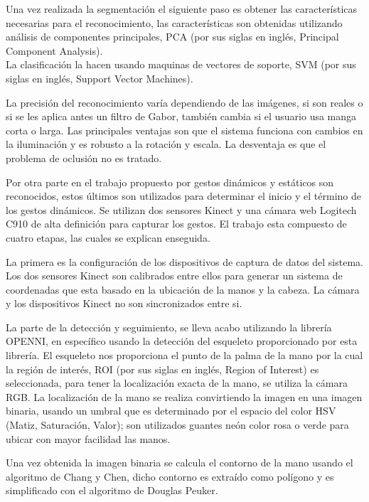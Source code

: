 Una vez realizada la segmentación el siguiente paso es obtener las características necesarias para el reconocimiento, las características son obtenidas utilizando análisis de componentes principales, PCA (por sus siglas en inglés, Principal Component Analysis).\\
La clasificación la hacen usando maquinas de vectores de soporte, SVM (por sus siglas en inglés, Support Vector Machines).   

La precisión del reconocimiento varía dependiendo de las imágenes, si son reales o si se les aplica antes un filtro de Gabor, también cambia si el usuario usa manga corta o larga.  
Las principales ventajas son que el sistema funciona con cambios en la iluminación y es robusto a la rotación y escala. La desventaja es que el problema de oclusi\'on no es tratado. 


Por otra parte en el trabajo propuesto por \citep{Caputo2012} gestos dinámicos y estáticos son reconocidos, estos últimos son utilizados para determinar el inicio y el término de los gestos dinámicos. Se utilizan dos sensores Kinect y una cámara web Logitech C910 de alta definición para capturar los gestos. El trabajo esta compuesto de cuatro etapas, las cuales se explican enseguida. 

La primera es la configuración de los dispositivos de captura de datos del sistema. Los dos sensores Kinect son calibrados entre ellos para generar un sistema de coordenadas que esta basado en la ubicación de la  manos y la cabeza. La cámara y los dispositivos Kinect no son sincronizados entre si.  

La parte de la detección y seguimiento, se lleva acabo utilizando la librería OPENNI, en específico usando la detección del esqueleto proporcionado por esta librería. El esqueleto nos proporciona el punto de la palma de la mano por la cual la región de interés, ROI (por sus siglas en inglés, Region of Interest) es seleccionada, para tener la localización exacta de la mano, se utiliza la cámara RGB. La localización de la mano se realiza convirtiendo la imagen en una imagen binaria, usando un umbral que es determinado por el espacio del color HSV (Matiz, Saturación, Valor); son utilizados guantes neón color rosa o verde para ubicar con mayor facilidad las manos.   

Una vez obtenida la imagen binaria se calcula el contorno de la mano usando el algoritmo de Chang y Chen, dicho contorno es extraído como polígono y  es simplificado con el algoritmo de Douglas Peuker. 


